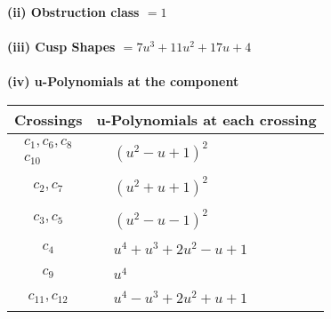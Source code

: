 \documentclass[1p]{elsarticle_modified}
\theoremstyle{definition}
\begin{document}
\flushleft \textbf{(ii) Obstruction class $= 1$}\\~\\
\flushleft \textbf{(iii) Cusp Shapes $= 7 u^3+11 u^2+17 u+4$}\\~\\
\newpage\renewcommand{\arraystretch}{1}
\flushleft \textbf{(iv) u-Polynomials at the component}\newline \\
\begin{tabular}{m{50pt}|m{274pt}}
Crossings & \hspace{64pt}u-Polynomials at each crossing \\
\hline $$\begin{aligned}c_{1},c_{6},c_{8}\\c_{10}\end{aligned}$$&$\begin{aligned}
&(u^2- u+1)^2
\end{aligned}$\\
\hline $$\begin{aligned}c_{2},c_{7}\end{aligned}$$&$\begin{aligned}
&(u^2+u+1)^2
\end{aligned}$\\
\hline $$\begin{aligned}c_{3},c_{5}\end{aligned}$$&$\begin{aligned}
&(u^2- u-1)^2
\end{aligned}$\\
\hline $$\begin{aligned}c_{4}\end{aligned}$$&$\begin{aligned}
&u^4+u^3+2 u^2- u+1
\end{aligned}$\\
\hline $$\begin{aligned}c_{9}\end{aligned}$$&$\begin{aligned}
&u^4
\end{aligned}$\\
\hline $$\begin{aligned}c_{11},c_{12}\end{aligned}$$&$\begin{aligned}
&u^4- u^3+2 u^2+u+1
\end{aligned}$\\
\hline
\end{tabular}\\~\\
\end{document}
